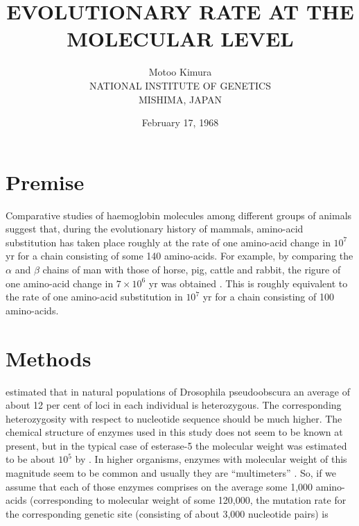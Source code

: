 \documentclass[12pt]{article}
\title{EVOLUTIONARY RATE AT THE MOLECULAR LEVEL}
\author{Motoo Kimura \\
NATIONAL INSTITUTE OF GENETICS \\
MISHIMA, JAPAN}
\date{February 17, 1968}
\begin{document}
\maketitle

\newpage


\newpage

\tableofcontents

\listoffigures

\newpage


\section{Premise}

Comparative studies of haemoglobin molecules among different groups of animals suggest that, during the evolutionary history of mammals, amino-acid substitution has taken place roughly at the rate of one amino-acid change in $10^7$ yr for a chain consisting of some 140 amino-acids.  For example, by comparing the $\alpha$ and $\beta$ chains of man with those of horse, pig, cattle and rabbit, the rigure of one amino-acid change in $7 \times 10^6$ yr was obtained \citep{zuckerkandl1965evolving}. This is roughly equivalent to the rate of one amino-acid substitution in $10^7$ yr for a chain consisting of 100 amino-acids.\\


\newpage

\section{Methods}

\citet{hubby1966molecular} estimated that in natural populations of Drosophila pseudoobscura an average of about 12 per cent of loci in each individual is heterozygous.  The corresponding heterozygosity with respect to nucleotide sequence should be much higher. The chemical structure of enzymes used in this study does not seem to be known at present, but in the typical case of esterase-5 the molecular weight was estimated to be about $10^5$ by \citet{narise1966purification}.  In higher organisms, enzymes with molecular weight of this magnitude seem to be common and usually they are ``multimeters'' \citep{fincham1968genetic}. So, if we assume that each of those enzymes comprises on the average some 1,000 amino-acids (corresponding to molecular weight of some 120,000, the mutation rate for the corresponding genetic site (consisting of about 3,000 nucleotide pairs) is \\
\end{document}
